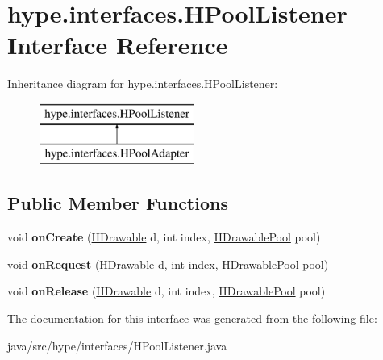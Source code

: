 \hypertarget{interfacehype_1_1interfaces_1_1_h_pool_listener}{\section{hype.\-interfaces.\-H\-Pool\-Listener Interface Reference}
\label{interfacehype_1_1interfaces_1_1_h_pool_listener}
}
Inheritance diagram for hype.\-interfaces.\-H\-Pool\-Listener\-:\begin{figure}[H]
\begin{center}
\leavevmode
\includegraphics[height=2.000000cm]{interfacehype_1_1interfaces_1_1_h_pool_listener}
\end{center}
\end{figure}
\subsection*{Public Member Functions}
\begin{DoxyCompactItemize}
\item 
\hypertarget{interfacehype_1_1interfaces_1_1_h_pool_listener_a64d77ade69a6c7be924af66f81f7d307}{void {\bfseries on\-Create} (\hyperlink{classhype_1_1drawable_1_1_h_drawable}{H\-Drawable} d, int index, \hyperlink{classhype_1_1util_1_1_h_drawable_pool}{H\-Drawable\-Pool} pool)}\label{interfacehype_1_1interfaces_1_1_h_pool_listener_a64d77ade69a6c7be924af66f81f7d307}

\item 
\hypertarget{interfacehype_1_1interfaces_1_1_h_pool_listener_a76401bacc56a1240b5eecf910dacf444}{void {\bfseries on\-Request} (\hyperlink{classhype_1_1drawable_1_1_h_drawable}{H\-Drawable} d, int index, \hyperlink{classhype_1_1util_1_1_h_drawable_pool}{H\-Drawable\-Pool} pool)}\label{interfacehype_1_1interfaces_1_1_h_pool_listener_a76401bacc56a1240b5eecf910dacf444}

\item 
\hypertarget{interfacehype_1_1interfaces_1_1_h_pool_listener_a20d5373cb940f031d629fe8419e55348}{void {\bfseries on\-Release} (\hyperlink{classhype_1_1drawable_1_1_h_drawable}{H\-Drawable} d, int index, \hyperlink{classhype_1_1util_1_1_h_drawable_pool}{H\-Drawable\-Pool} pool)}\label{interfacehype_1_1interfaces_1_1_h_pool_listener_a20d5373cb940f031d629fe8419e55348}

\end{DoxyCompactItemize}


The documentation for this interface was generated from the following file\-:\begin{DoxyCompactItemize}
\item 
java/src/hype/interfaces/H\-Pool\-Listener.\-java\end{DoxyCompactItemize}
